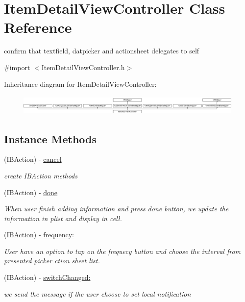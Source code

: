 \hypertarget{interface_item_detail_view_controller}{\section{Item\-Detail\-View\-Controller Class Reference}
\label{interface_item_detail_view_controller}
}


confirm that textfield, datpicker and actionsheet delegates to self  




{\ttfamily \#import $<$Item\-Detail\-View\-Controller.\-h$>$}

Inheritance diagram for Item\-Detail\-View\-Controller\-:\begin{figure}[H]
\begin{center}
\leavevmode
\includegraphics[height=1.043478cm]{interface_item_detail_view_controller}
\end{center}
\end{figure}
\subsection*{Instance Methods}
\begin{DoxyCompactItemize}
\item 
(I\-B\-Action) -\/ \hyperlink{interface_item_detail_view_controller_ab6d971493be16b96b2df7abf8c910dde}{cancel}
\begin{DoxyCompactList}\small\item\em create I\-B\-Action methods \end{DoxyCompactList}\item 
(I\-B\-Action) -\/ \hyperlink{interface_item_detail_view_controller_ad5e59f3b6bf4812c4958f1fe424131da}{done}
\begin{DoxyCompactList}\small\item\em When user finish adding information and press done button, we update the information in plist and display in cell. \end{DoxyCompactList}\item 
(I\-B\-Action) -\/ \hyperlink{interface_item_detail_view_controller_a70b1b4a4ad9d3487233b1c296b78f8a5}{frequency\-:}
\begin{DoxyCompactList}\small\item\em User have an option to tap on the frequecy button and choose the interval from presented picker ction sheet list. \end{DoxyCompactList}\item 
(I\-B\-Action) -\/ \hyperlink{interface_item_detail_view_controller_a3bfd6fa9e115a4c87d72859071767d9b}{switch\-Changed\-:}
\begin{DoxyCompactList}\small\item\em we send the message if the user choose to set local notification \end{DoxyCompactList}\end{DoxyCompactItemize}
